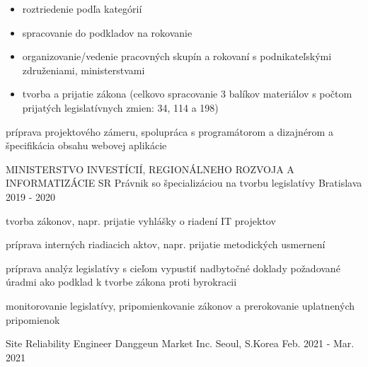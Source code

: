 \begin{cventries}
{\begin{cvitems}
\begin{itemize}[leftmargin=3ex, label=\bullet]
          \item {roztriedenie podľa kategórií}
          \item {spracovanie do podkladov na rokovanie}
          \item {organizovanie/vedenie pracovných skupín a rokovaní s podnikateľskými združeniami, ministerstvami}
          \item {tvorba a prijatie zákona (celkovo spracovanie 3 balíkov materiálov s počtom prijatých legislatívnych zmien: 34, 114 a 198)}
        \end{itemize}
        \item {príprava projektového zámeru, spolupráca s programátorom a dizajnérom a špecifikácia obsahu webovej aplikácie}
      \end{cvitems}
    }

  \cventry
    {MINISTERSTVO INVESTÍCIÍ, REGIONÁLNEHO ROZVOJA A INFORMATIZÁCIE SR} %
    {Právnik so špecializáciou na tvorbu legislatívy} %
    {Bratislava} %
    {2019 - 2020} %
    {
      \begin{cvitems} %
        \item {tvorba zákonov, napr. prijatie vyhlášky o riadení IT projektov}
        \item {príprava interných riadiacich aktov, napr. prijatie metodických usmernení}
        \item {príprava analýz legislatívy s cieľom vypustiť nadbytočné doklady požadované úradmi ako podklad k tvorbe zákona proti byrokracii}
        \item {monitorovanie legislatívy, pripomienkovanie zákonov a prerokovanie uplatnených pripomienok}
      \end{cvitems}
    }

  \cventry
    {Site Reliability Engineer} %
    {Danggeun Market Inc.} %
    {Seoul, S.Korea} %
    {Feb. 2021 - Mar. 2021} %
    {
    }


\end{cventries}
